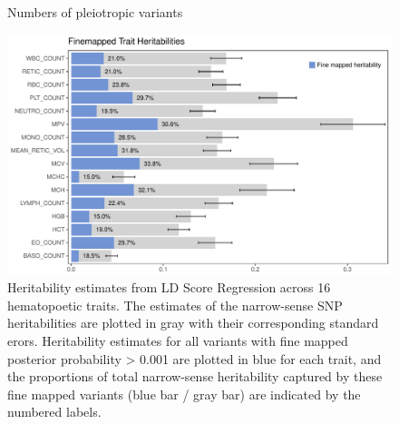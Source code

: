 \documentclass{article}\usepackage[]{graphicx}\usepackage[]{color}
\makeatletter
\def\maxwidth{ %
  \ifdim\Gin@nat@width>\linewidth
    \linewidth
  \else
    \Gin@nat@width
  \fi
}
\newenvironment{knitrout}{}{} %
\makeatother
\begin{document}
\begin{enumerate}[label=(\Alph*)]
\begin{knitrout}
\begin{figure}[H]
{}

\caption[Numbers of pleiotropic variants]{Numbers of pleiotropic variants}\label{fig:pleiotropyPlots}
\end{figure}


\end{knitrout}

\begin{knitrout}
\color{fgcolor}\begin{figure}[H]

{\centering \includegraphics[width=\maxwidth]{figure/heritabilityPlots-1} 

}

\caption[Heritability estimates from LD Score Regression across 16 hematopoetic traits]{Heritability estimates from LD Score Regression across 16 hematopoetic traits. The estimates of the narrow-sense SNP heritabilities are plotted in gray with their corresponding standard erors. Heritability estimates for all variants with fine mapped posterior probability > 0.001 are plotted in blue for each trait, and the proportions of total narrow-sense heritability captured by these fine mapped variants (blue bar / gray bar) are indicated by the numbered labels.}\label{fig:heritabilityPlots}
\end{figure}


\end{knitrout}

\begin{knitrout}
\color{fgcolor}\begin{figure}[H]


\end{figure}
\end{knitrout}
\end{enumerate}
\end{document}

